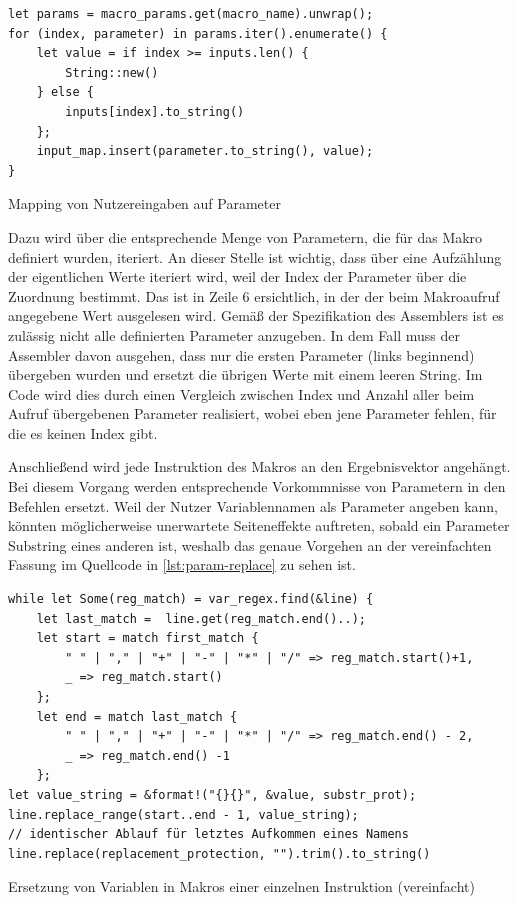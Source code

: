 \begin{listing}[th]
\begin{verbatim}
let params = macro_params.get(macro_name).unwrap();
for (index, parameter) in params.iter().enumerate() {
	let value = if index >= inputs.len() {
    	String::new()
    } else {
    	inputs[index].to_string()
    };
    input_map.insert(parameter.to_string(), value);
}
\end{verbatim}
\label{lst:var-map}
\caption{Mapping von Nutzereingaben auf Parameter}
\end{listing}

Dazu wird über die entsprechende Menge von Parametern, die für das Makro definiert wurden, iteriert. An dieser Stelle ist wichtig, dass über eine Aufzählung der eigentlichen Werte iteriert wird, weil der Index der Parameter über die Zuordnung bestimmt. Das ist in Zeile 6 ersichtlich, in der der beim Makroaufruf angegebene Wert ausgelesen wird. Gemäß der Spezifikation des Assemblers ist es zulässig nicht alle definierten Parameter anzugeben. In dem Fall muss der Assembler davon ausgehen, dass nur die ersten Parameter (links beginnend) übergeben wurden und ersetzt die übrigen Werte mit einem leeren String. Im Code wird dies durch einen Vergleich zwischen Index und Anzahl aller beim Aufruf übergebenen Parameter realisiert, wobei eben jene Parameter fehlen, für die es keinen Index gibt.

Anschließend wird jede Instruktion des Makros an den Ergebnisvektor angehängt. Bei diesem Vorgang werden entsprechende Vorkommnisse von Parametern in den Befehlen ersetzt. Weil der Nutzer Variablennamen als Parameter angeben kann, könnten möglicherweise unerwartete Seiteneffekte auftreten, sobald ein Parameter Substring eines anderen ist, weshalb das genaue Vorgehen an der vereinfachten Fassung im Quellcode in \ref{lst:param-replace} zu sehen ist.

\begin{listing}[th]
\begin{verbatim}
while let Some(reg_match) = var_regex.find(&line) {
    let last_match =  line.get(reg_match.end()..);
    let start = match first_match {
        " " | "," | "+" | "-" | "*" | "/" => reg_match.start()+1,
        _ => reg_match.start()
    };
    let end = match last_match {
        " " | "," | "+" | "-" | "*" | "/" => reg_match.end() - 2,
        _ => reg_match.end() -1
    };
let value_string = &format!("{}{}", &value, substr_prot);
line.replace_range(start..end - 1, value_string);
// identischer Ablauf für letztes Aufkommen eines Namens
line.replace(replacement_protection, "").trim().to_string()
\end{verbatim}
\label{lst:param-replace}
\caption{Ersetzung von Variablen in Makros einer einzelnen Instruktion (vereinfacht)}
\end{listing}

